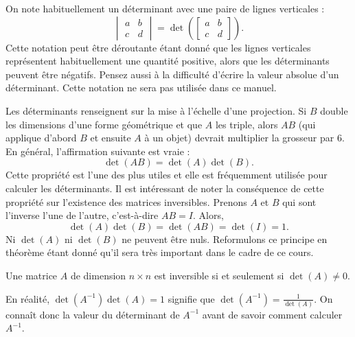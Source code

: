 On note habituellement un déterminant avec une paire de lignes verticales :
\begin{equation*}
\begin{vmatrix}
a & b \\
c & d
\end{vmatrix}
=
\det \left(
\begin{bmatrix}
a & b \\
c & d
\end{bmatrix}
\right) .
\end{equation*}
Cette notation peut être déroutante étant donné que les lignes verticales représentent habituellement une quantité positive, alors que les déterminants peuvent être négatifs. Pensez aussi à la difficulté d'écrire la valeur absolue d'un déterminant. Cette notation ne sera pas utilisée dans ce manuel.

\medskip

Les déterminants renseignent sur la mise à l'échelle d'une projection. Si $B$ double les dimensions d'une forme géométrique et que $A$ les triple, alors $AB$ (qui applique d'abord $B$ et ensuite $A$ à un objet) devrait multiplier la grosseur par $6$. En général, l'affirmation suivante est vraie :
\begin{equation*}
\det(AB) = \det(A)\det(B) .
\end{equation*}
Cette propriété est l'une des plus utiles et elle est fréquemment utilisée pour calculer les déterminants. Il est intéressant de noter la conséquence de cette propriété sur l'existence des matrices inversibles. Prenons $A$ et $B$ qui sont l'inverse l'une de l'autre, c'est-à-dire $AB=I$. Alors,
\begin{equation*}
\det(A)\det(B) = \det(AB) = \det(I) = 1 .
\end{equation*}
Ni $\det(A)$ ni $\det(B)$ ne peuvent être nuls. Reformulons ce principe en théorème étant donné qu'il sera très important dans le cadre de ce cours.

\begin{theorem}
Une matrice $A$ de dimension $n \times n$ est inversible si et seulement si $\det (A) \not= 0$.
\end{theorem}

En réalité, $\det(A^{-1}) \det(A) = 1$ signifie que $\det(A^{-1}) =
\frac{1}{\det(A)}$. On connaît donc la valeur du déterminant de $A^{-1}$ avant de savoir comment calculer $A^{-1}$.

